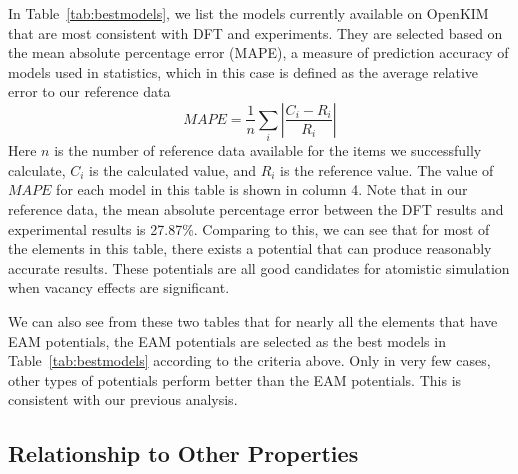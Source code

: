 \documentclass[%
 reprint,
 amsmath,amssymb,
 aps,
]{revtex4-1}
\begin{document}
In Table~\ref{tab:bestmodels}, we list the models currently available on OpenKIM that are most consistent with DFT and experiments.
They are selected based on the mean absolute percentage error (MAPE), a measure of prediction accuracy of models used in statistics, which in this case is defined as the average relative error to our reference data
\begin{equation}
\label{eq:mape}
\mathit{MAPE} = \frac{1}{n}\sum_i\left|\frac{C_i-R_i}{R_i}\right|
\end{equation}
Here $n$ is the number of reference data available for the items we successfully calculate, $C_i$ is the calculated value, and $R_i$ is the reference value.
The value of $\mathit{MAPE}$ for each model in this table is shown in column 4.
Note that in our reference data, the mean absolute percentage error between the DFT results and experimental results is 27.87\%.
Comparing to this, we can see that for most of the elements in this table, there exists a potential that can produce reasonably accurate results.
These potentials are all good candidates for atomistic simulation when vacancy effects are significant.

We can also see from these two tables that for nearly all the elements that have EAM potentials, the EAM potentials are selected as the best models in Table~\ref{tab:bestmodels} according to the criteria above.
Only in very few cases, other types of potentials perform better than the EAM potentials.
This is consistent with our previous analysis.

\subsection{\label{sec:calcvsprop}Relationship to Other Properties}
\end{document}

